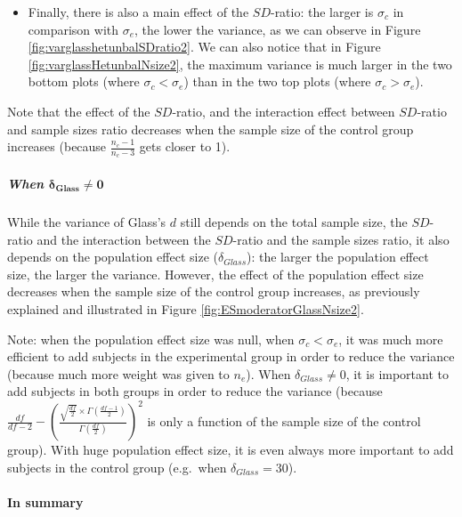 \documentclass[
  english,
  man,mask]{apa6}
\providecommand{\tightlist}{%
  \setlength{\itemsep}{0pt}\setlength{\parskip}{0pt}}
\let\oldparagraph\paragraph
\renewcommand{\paragraph}[1]{\oldparagraph{#1}\mbox{}}
\let\oldsubparagraph\subparagraph
\renewcommand{\subparagraph}[1]{\oldsubparagraph{#1}\mbox{}}
\begin{document}
\begin{itemize}
\tightlist
\item
  Finally, there is also a main effect of the \(SD\)-ratio: the larger is \(\sigma_c\) in comparison with \(\sigma_e\), the lower the variance, as we can observe in Figure \ref{fig:varglasshetunbalSDratio2}. We can also notice that in Figure \ref{fig:varglassHetunbalNsize2}, the maximum variance is much larger in the two bottom plots (where \(\sigma_c<\sigma_e\)) than in the two top plots (where \(\sigma_c>\sigma_e\)).
\end{itemize}

Note that the effect of the \(SD\)-ratio, and the interaction effect between \(SD\)-ratio and sample sizes ratio decreases when the sample size of the control group increases (because \(\frac{n_c-1}{n_c-3}\) gets closer to 1).

\hypertarget{when-bmdelta_glass-neq-0-2}{%
\subparagraph{\texorpdfstring{When \(\bm{\delta_{Glass} \neq 0}\)}{When \textbackslash bm\{\textbackslash delta\_\{Glass\} \textbackslash neq 0\}}}\label{when-bmdelta_glass-neq-0-2}}

While the variance of Glass's \(d\) still depends on the total sample size, the \(SD\)-ratio and the interaction between the \(SD\)-ratio and the sample sizes ratio, it also depends on the population effect size (\(\delta_{Glass}\)): the larger the population effect size, the larger the variance. However, the effect of the population effect size decreases when the sample size of the control group increases, as previously explained and illustrated in Figure \ref{fig:ESmoderatorGlassNsize2}.

Note: when the population effect size was null, when \(\sigma_c<\sigma_e\), it was much more efficient to add subjects in the experimental group in order to reduce the variance (because much more weight was given to \(n_e\)). When \(\delta_{Glass} \neq 0\), it is important to add subjects in both groups in order to reduce the variance (because \(\frac{df}{df-2} - \left( \frac{\sqrt{\frac{df}{2}} \times \Gamma \left(\frac{df-1}{2} \right)}{\Gamma \left( \frac{df}{2}\right)}\right)^2\) is only a function of the sample size of the control group). With huge population effect size, it is even always more important to add subjects in the control group (e.g.~when \(\delta_{Glass}=30\)).

\hypertarget{in-summary-2}{%
\paragraph{In summary}\label{in-summary-2}}
\end{document}
